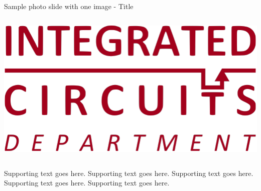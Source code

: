\documentclass[aspectratio=169, t, 9pt]{beamer} %
\begin{document}
\begin{frame}{Sample photo slide with one image - Title}
\begin{groupcolumns}
    \begin{column}{0.55\textwidth}
        \includegraphics{./template/images/IC.pdf}%
    \end{column}
    \hfill
    \vrule width 0.3pt%
    \hfill
    \begin{column}{0.3\textwidth}

        Supporting text goes here. Supporting text goes here. Supporting text goes here. Supporting text goes here. Supporting text goes here.
    \end{column}
\end{groupcolumns}
\end{frame}
\end{document}
